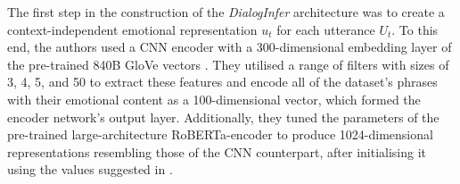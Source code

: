 The first step in the construction of the \textit{DialogInfer} architecture was to create a context-independent emotional representation $u_t$ for each utterance $U_t$. To this end, the authors used a CNN encoder with a 300-dimensional embedding layer of the pre-trained 840B GloVe vectors \cite{pennington-etal-2014-glove}. They utilised a range of filters with sizes of 3, 4, 5, and 50 to extract these features and encode all of the dataset's phrases with their emotional content as a 100-dimensional vector, which formed the encoder network's output layer. Additionally, they tuned the parameters of the pre-trained large-architecture RoBERTa-encoder to produce 1024-dimensional representations resembling those of the CNN counterpart, after initialising it using the values suggested in \cite{https://doi.org/10.48550/arxiv.1907.11692}.

